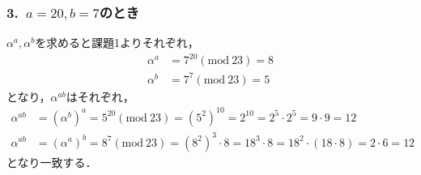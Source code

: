 \documentclass[a4paper,12pt]{jarticle}
\begin{document}
\subsubsection*{3.~$a=20,b=7$のとき}
\vspace{-4mm}
$\alpha^a,\alpha^b$を求めると課題1よりそれぞれ，
%
\begin{align}
 \alpha^a&=7^{20}(\mathrm{mod}~23)=8 \\
 \alpha^b&=7^{7}(\mathrm{mod}~23)=5
\end{align}
%
となり，$\alpha^{ab}$はそれぞれ，
%
\begin{align}
 \alpha^{ab}&=(\alpha^b)^a=5^{20}(\mathrm{mod}~23)=(5^2)^{10}=2^{10}=2^5\cdot2^5=9\cdot9=12\\
 \alpha^{ab}&=(\alpha^a)^b=8^7(\mathrm{mod}~23)=(8^2)^3\cdot8=18^3\cdot8=18^2\cdot(18\cdot8)=2\cdot6=12
\end{align}
%
となり一致する．
\end{document}
